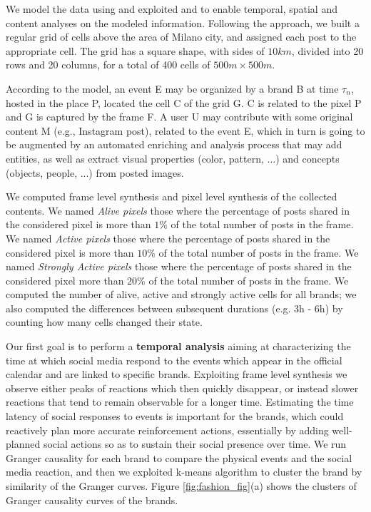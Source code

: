 {We model the data using \frappe{} and exploited \sti{} and \hivedi{} to enable temporal, spatial and content analyses on the modeled information.
Following the \frappe{} approach, we built a regular grid of cells above the area of Milano city, and assigned each post to the appropriate cell. The grid has a square shape, with sides of $10km$, divided into 20 rows and 20 columns, for a total of 400 cells of $500m \times 500m$. 

According to the \frappe{} model, an event \textsf{E} may be organized by a brand \textsf{B} at time $\tau_{n}$, hosted in the place \textsf{P}, located the cell \textsf{C} of the grid \textsf{G}. \textsf{C} is related to the pixel \textsf{P} and \textsf{G} is captured by the frame \textsf{F}. A user \textsf{U} may contribute with some original content \textsf{M} (e.g., Instagram post), related to the event \textsf{E}, which in turn is going to be augmented by an automated enriching and analysis process that may add entities, as well as extract visual properties (color, pattern, ...) and concepts (objects, people, ...) from posted images.

We computed frame level synthesis and pixel level synthesis of the collected contents. 
We named \emph{Alive pixels} those where the percentage of posts shared in the considered pixel is more than $1\%$ of the total number of posts in the frame. We named \emph{Active pixels} those where the percentage of posts shared in the considered pixel is more than $10\%$ of the total number of posts in the frame. We named \emph{Strongly Active pixels} those where the percentage of posts shared in the considered pixel more than $20\%$ of the total number of posts in the frame.
We computed the number of alive, active and strongly active cells for all brands; we also computed the differences between subsequent durations (e.g. 3h - 6h) by counting how many cells changed their state.

Our first goal is to perform a \textbf{temporal analysis} aiming at characterizing the time at which social media respond to the events which appear in the official calendar and are linked to specific brands. 
Exploiting frame level synthesis we observe either peaks of reactions which then quickly disappear, or instead slower reactions that tend to remain observable for a longer time. Estimating the time latency of social responses to events is important for the brands, which could reactively plan more accurate reinforcement actions, essentially by adding well-planned social actions so as to sustain their social presence over time. We run Granger causality for each brand to compare the physical events and the social media reaction, and then we exploited k-means algorithm to cluster the brand by similarity of the Granger curves.
Figure \ref{fig:fashion_fig}(a) shows the clusters of Granger causality curves of the brands.

}
